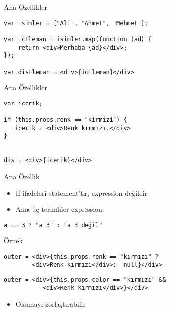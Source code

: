 \documentclass[presentation]{beamer}
\begin{document}
\begin{frame}[fragile,label={sec:org0543cfe}]{Ana Özellikler}
 \begin{verbatim}
var isimler = ["Ali", "Ahmet", "Mehmet"];

var icEleman = isimler.map(function (ad) {
    return <div>Merhaba {ad}</div>;
});

var disEleman = <div>{icEleman}</div>
\end{verbatim}
\end{frame}

\begin{frame}[fragile,label={sec:org52b58d1}]{Ana Özellikler}
 \begin{verbatim}
var icerik;

if (this.props.renk == "kirmizi") {
   icerik = <div>Renk kırmızı.</div>
}


dis = <div>{icerik}</div>
\end{verbatim}
\end{frame}

\begin{frame}[fragile,label={sec:orgd36c4e7}]{Ana Özellik}
 \begin{itemize}
\item If ifadeleri statement'tır, expression değildir
\item Ama üç terimliler expression:
\end{itemize}
\begin{verbatim}
a == 3 ? "a 3" : "a 3 değil"
\end{verbatim}

\begin{block}{Örnek}
\begin{verbatim}
outer = <div>{this.props.renk == "kırmızı" ?
		<div>Renk kırmızı</div>:  null}</div>
\end{verbatim}

\begin{verbatim}
outer = <div>{this.props.color == "kırmızı" &&
	       <div>Renk kırmızı</div>}</div>
\end{verbatim}

\begin{itemize}
\item Okumayı zorlaştırabilir
\end{itemize}
\end{block}
\end{frame}
\end{document}
